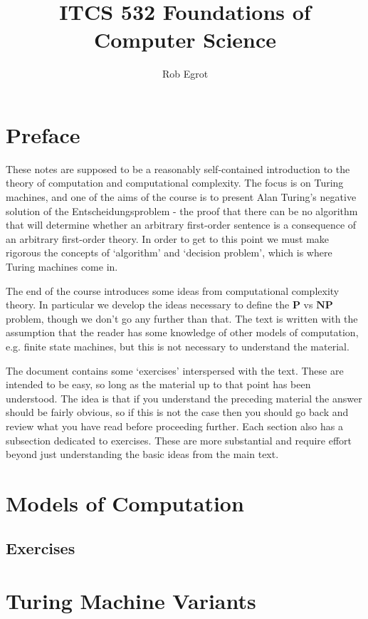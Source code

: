 \documentclass{article}
\title{ITCS 532 Foundations of Computer Science}
\author{Rob Egrot}
\date{}
\theoremstyle{plain}
\newcommand{\Po}{\mathbf{P}}
\newcommand{\NP}{\mathbf{NP}}
\begin{document}
\maketitle
\tableofcontents
\section{Preface}
These notes are supposed to be a reasonably self-contained introduction to the theory of computation and computational complexity. The focus is on Turing machines, and one of the aims of the course is to present Alan Turing's negative solution of the Entscheidungsproblem - the proof that there can be no algorithm that will determine whether an arbitrary first-order sentence is a consequence of an arbitrary first-order theory. In order to get to this point we must make rigorous the concepts of `algorithm' and `decision problem', which is where Turing machines come in. 

The end of the course introduces some ideas from computational complexity theory. In particular we develop the ideas necessary to define the $\Po$ vs $\NP$ problem, though we don't go any further than that. The text is written with the assumption that the reader has some knowledge of other models of computation, e.g. finite state machines, but this is not necessary to understand the material. 

The document contains some `exercises' interspersed with the text. These are intended to be easy, so long as the material up to that point has been understood. The idea is that if you understand the preceding material the answer should be fairly obvious, so if this is not the case then you should go back and review what you have read before proceeding further. Each section also has a subsection dedicated to exercises. These are more substantial and require effort beyond just understanding the basic ideas from the main text.   
\section{Models of Computation}

\subsection{Exercises}

\newpage

\section{Turing Machine Variants}\label{S:TMvar}

\end{document}
